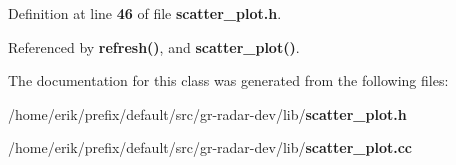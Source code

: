 Definition at line {\bf 46} of file {\bf scatter\+\_\+plot.\+h}.



Referenced by {\bf refresh()}, and {\bf scatter\+\_\+plot()}.



The documentation for this class was generated from the following files\+:\begin{DoxyCompactItemize}
\item 
/home/erik/prefix/default/src/gr-\/radar-\/dev/lib/{\bf scatter\+\_\+plot.\+h}\item 
/home/erik/prefix/default/src/gr-\/radar-\/dev/lib/{\bf scatter\+\_\+plot.\+cc}\end{DoxyCompactItemize}
